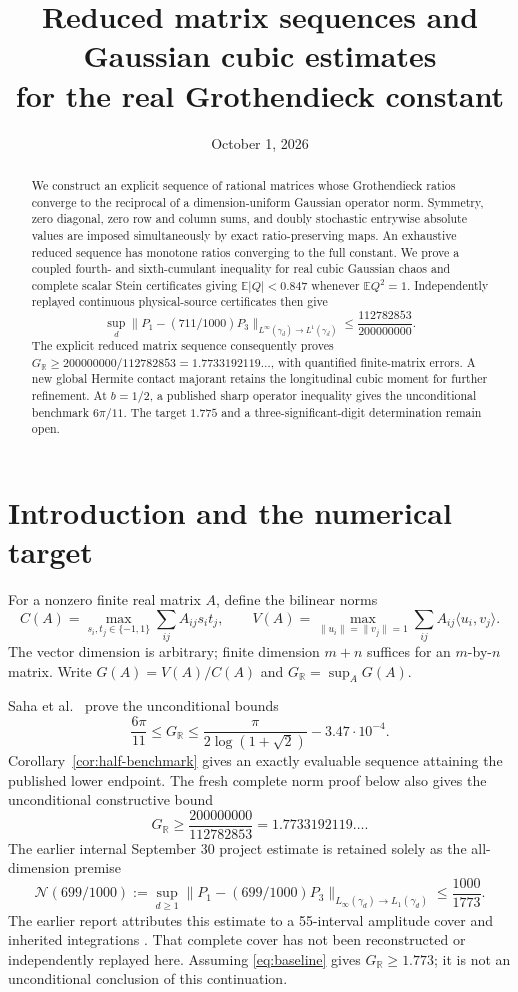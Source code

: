 \documentclass[11pt]{article}
\title{Reduced matrix sequences and Gaussian cubic estimates\\for the real Grothendieck constant}
\author{}
\date{October 1, 2026}
\newcommand{\R}{\mathbb R}
\newcommand{\E}{\mathbb E}
\newcommand{\GR}{G_{\R}}
\newcommand{\ip}[2]{\langle #1,#2\rangle}
\newcommand{\norm}[1]{\lVert #1\rVert}
\newcommand{\N}{\mathcal N}
\begin{document}
\maketitle
\begin{abstract}
We construct an explicit sequence of rational matrices whose Grothendieck
ratios converge to the reciprocal of a dimension-uniform Gaussian operator
norm. Symmetry, zero diagonal, zero row and column sums, and doubly stochastic
entrywise absolute values are imposed simultaneously by exact ratio-preserving
maps. An exhaustive reduced sequence has monotone ratios converging to
the full constant. We prove a coupled fourth- and sixth-cumulant inequality for
real cubic Gaussian chaos and complete scalar Stein certificates giving
$\E|Q|<0.847$ whenever $\E Q^2=1$. Independently replayed continuous
physical-source certificates then give
\[
 \sup_d\|P_1-(711/1000)P_3\|_{L^\infty(\gamma_d)\to L^1(\gamma_d)}
 \le\frac{112782853}{200000000}.
\]
The explicit reduced matrix sequence consequently proves
$\GR\ge200000000/112782853=1.7733192119\ldots$, with quantified
finite-matrix errors. A new global Hermite contact majorant retains the
longitudinal cubic moment for further refinement. At $b=1/2$, a published
sharp operator inequality gives the unconditional benchmark $6\pi/11$.
The target $1.775$ and a three-significant-digit determination remain open.
\end{abstract}

\section{Introduction and the numerical target}
For a nonzero finite real matrix $A$, define the bilinear norms
\[
 C(A)=\max_{s_i,t_j\in\{-1,1\}}\sum_{ij}A_{ij}s_it_j,
 \qquad
 V(A)=\max_{\norm{u_i}=\norm{v_j}=1}
                 \sum_{ij}A_{ij}\ip{u_i}{v_j}.
\]
The vector dimension is arbitrary; finite dimension $m+n$ suffices for an
$m$-by-$n$ matrix. Write $G(A)=V(A)/C(A)$ and
$\GR=\sup_A G(A)$.

Saha et al.~\cite{saha} prove the unconditional bounds
\[
 \frac{6\pi}{11}\le\GR\le
 \frac{\pi}{2\log(1+\sqrt2)}-3.47\cdot10^{-4}.
\]
Corollary~\ref{cor:half-benchmark} gives an exactly evaluable sequence
attaining the published lower endpoint. The fresh complete norm proof below
also gives the unconditional constructive bound
\[
 \GR\ge\frac{200000000}{112782853}=1.7733192119\ldots.
\]
 The earlier internal September 30
project estimate is retained solely as the all-dimension premise
\begin{equation}\label{eq:baseline}
 \N(699/1000):=
 \sup_{d\ge1}\norm{P_1-(699/1000)P_3}_{L_\infty(\gamma_d)\to L_1(\gamma_d)}
 \le\frac{1000}{1773}.
\end{equation}
The earlier report attributes this estimate to a 55-interval amplitude
cover and inherited integrations \cite{baseline}. That complete cover
has not been reconstructed or independently replayed here. Assuming
\eqref{eq:baseline} gives $\GR\ge1.773$; it is not an unconditional
conclusion of this continuation.
\end{document}

